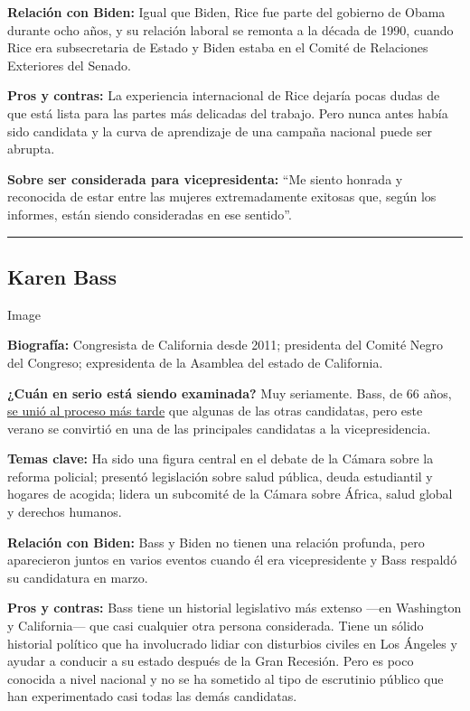 \textbf{Relación con Biden:} Igual que Biden, Rice fue parte del
gobierno de Obama durante ocho años, y su relación laboral se remonta a
la década de 1990, cuando Rice era subsecretaria de Estado y Biden
estaba en el Comité de Relaciones Exteriores del Senado.

\textbf{Pros y contras:} La experiencia internacional de Rice dejaría
pocas dudas de que está lista para las partes más delicadas del trabajo.
Pero nunca antes había sido candidata y la curva de aprendizaje de una
campaña nacional puede ser abrupta.

\textbf{Sobre ser considerada para vicepresidenta:} ``Me siento honrada
y reconocida de estar entre las mujeres extremadamente exitosas que,
según los informes, están siendo consideradas en ese sentido''.

\begin{center}\rule{0.5\linewidth}{\linethickness}\end{center}

\hypertarget{karen-bass}{%
\subsection{Karen Bass}\label{karen-bass}}

Image

\textbf{Biografía:} Congresista de California desde 2011; presidenta del
Comité Negro del Congreso; expresidenta de la Asamblea del estado de
California.

\textbf{¿Cuán en serio está siendo examinada?} Muy seriamente. Bass, de
66 años,
\href{https://www.nytimes.com/2020/06/23/us/politics/karen-bass-joe-biden-vp.html}{se
unió al proceso más tarde} que algunas de las otras candidatas, pero
este verano se convirtió en una de las principales candidatas a la
vicepresidencia.

\textbf{Temas clave:} Ha sido una figura central en el debate de la
Cámara sobre la reforma policial; presentó legislación sobre salud
pública, deuda estudiantil y hogares de acogida; lidera un subcomité de
la Cámara sobre África, salud global y derechos humanos.

\textbf{Relación con Biden:} Bass y Biden no tienen una relación
profunda, pero aparecieron juntos en varios eventos cuando él era
vicepresidente y Bass respaldó su candidatura en marzo.

\textbf{Pros y contras:} Bass tiene un historial legislativo más extenso
---en Washington y California--- que casi cualquier otra persona
considerada. Tiene un sólido historial político que ha involucrado
lidiar con disturbios civiles en Los Ángeles y ayudar a conducir a su
estado después de la Gran Recesión. Pero es poco conocida a nivel
nacional y no se ha sometido al tipo de escrutinio público que han
experimentado casi todas las demás candidatas.


